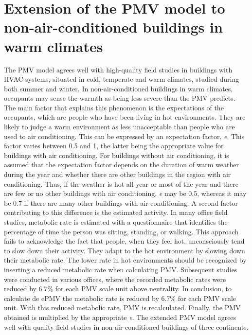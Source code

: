 \newpage
\section{Extension of the PMV model to non-air-conditioned buildings in warm climates}
The PMV model agrees well with high-quality field studies in buildings with HVAC systems, situated in cold, temperate and warm climates, studied during both summer and winter. In non-air-conditioned buildings in warm climates, occupants may sense the warmth as being less severe than the PMV predicts. The main factor that explains this phenomenon is the expectations of the occupants, which are people who have been living in hot environments. They are likely to judge a warm environment as less unacceptable than people who are used to air conditioning. This can be expressed by an expectation factor, \textit{e}. This factor varies between 0.5 and 1, the latter being the appropriate value for buildings with air conditioning. For buildings without air conditioning, it is assumed that the expectation factor depends on the duration of warm weather during the year and whether there are other buildings in the region with air conditioning. Thus, if the weather is hot all year or most of the year and there are few or no other buildings with air conditioning, \textit{e} may be 0.5, whereas it may be 0.7 if there are many other buildings with air-conditioning. A second factor contributing to this difference is the estimated activity. In many office field studies, metabolic rate is estimated with a questionnaire that identifies the percentage of time the person was sitting, standing, or walking. This approach fails to acknowledge the fact that people, when they feel hot, unconsciously tend to slow down their activity. They adapt to the hot environment by slowing down their metabolic rate. The lower rate in hot environments should be recognized by inserting a reduced metabolic rate when calculating PMV. Subsequent studies were conducted in various offices, where the recorded metabolic rates were reduced by 6.7\% for each PMV scale unit above neutrality. In conclusion, to calculate de ePMV the metabolic rate is reduced by 6.7\% for each PMV scale unit. With this reduced metabolic rate, PMV is recalculated. Finally, the PMV obtained is multiplied by the appropriate \textit{e}. The extended PMV model agrees well with quality field studies in non-air-conditioned buildings of three continents.



      

